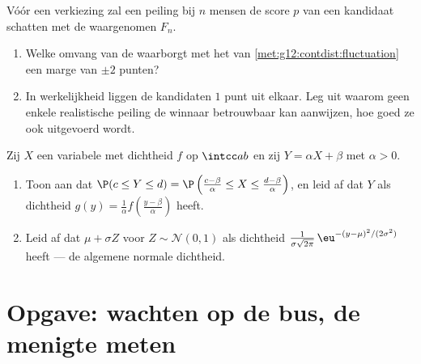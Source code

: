 \begin{exercise}[$\star\star\star$]\label{exo:g12:contdist:8}
Vóór een verkiezing zal een peiling bij $n$ mensen de score $p$ van een
kandidaat schatten met de waargenomen  $F_n$.
\begin{enumerate}
  \item Welke omvang van de  waarborgt met het
         van \cref{met:g12:contdist:fluctuation} een
        marge van $\pm 2$ punten?
  \item In werkelijkheid liggen de kandidaten $1$ punt uit elkaar. Leg uit
        waarom geen enkele realistische peiling de winnaar betrouwbaar kan
        aanwijzen, hoe goed ze ook uitgevoerd wordt.
\end{enumerate}
\end{exercise}

\begin{exercise}[$\star\star\star$]\label{exo:g12:contdist:9}
Zij $X$ een variabele met dichtheid $f$ op $\intcc ab$ en zij
$Y = \alpha X + \beta$ met $\alpha > 0$.
\begin{enumerate}
  \item Toon aan dat $\P(c \leq Y \leq d)
        = \P\left(\frac{c - \beta}{\alpha} \leq X \leq
        \frac{d-\beta}{\alpha}\right)$, en leid af dat $Y$ als dichtheid
        $g(y) = \frac{1}{\alpha} f\left(\frac{y - \beta}{\alpha}\right)$
        heeft.
  \item Leid af dat $\mu + \sigma Z$ voor $Z \sim \mathcal N(0,1)$ als
        dichtheid $\frac{1}{\sigma\sqrt{2\pi}}\,
        \eu^{-(y - \mu)^2/(2\sigma^2)}$ heeft --- de algemene normale
        dichtheid.
\end{enumerate}
\end{exercise}

\section{Opgave: wachten op de bus, de menigte meten}

